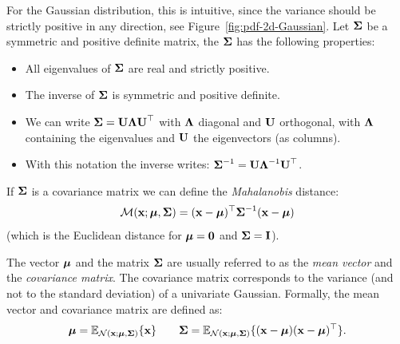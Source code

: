 
For the Gaussian distribution, this is intuitive, since the variance should be strictly positive in any direction, see Figure~\ref{fig:pdf-2d-Gaussian}. Let $\boldsymbol{\mathbf{\Sigma}}$ be a symmetric and positive definite matrix, the $\boldsymbol{\mathbf{\Sigma}}$ has the following properties:
\begin{itemize}
    \item All eigenvalues of $\boldsymbol{\mathbf{\Sigma}}$ are real and  strictly positive.
    \item The inverse of $\boldsymbol{\mathbf{\Sigma}}$ is symmetric and positive definite.
    \item We can write $\boldsymbol{\mathbf{\Sigma}}=\boldsymbol{\mathbf{U}}\boldsymbol{\mathbf{\Lambda}}\boldsymbol{\mathbf{U}}^\top$ with $\boldsymbol{\mathbf{\Lambda}}$ diagonal and $\boldsymbol{\mathbf{U}}$ orthogonal, with $\boldsymbol{\mathbf{\Lambda}}$ containing the eigenvalues and $\boldsymbol{\mathbf{U}}$ the eigenvectors (as columns).
    \item With this notation the inverse writes: $\boldsymbol{\mathbf{\Sigma}}^{-1} = \boldsymbol{\mathbf{U}}\boldsymbol{\mathbf{\Lambda}}^{-1}\boldsymbol{\mathbf{U}}^\top$.
\end{itemize}


If $\boldsymbol{\mathbf{\Sigma}}$ is a covariance matrix we can define the \textit{Mahalanobis} distance:
\begin{equation}
\mathcal{M}(\boldsymbol{\mathbf{x}};\boldsymbol{\mathbf{\mu}},\boldsymbol{\mathbf{\Sigma}}) = (\boldsymbol{\mathbf{x}}-\boldsymbol{\mathbf{\mu}})^\top\boldsymbol{\mathbf{\Sigma}}^{-1}(\boldsymbol{\mathbf{x}}-\boldsymbol{\mathbf{\mu}})
\end{equation}
(which is the Euclidean distance for $\boldsymbol{\mathbf{\mu}}=\boldsymbol{\mathbf{0}}$ and $\boldsymbol{\mathbf{\Sigma}}=\boldsymbol{\mathbf{I}}$).\\


The vector $\boldsymbol{\mathbf{\mu}}$ and the matrix $\boldsymbol{\mathbf{\Sigma}}$ are usually referred to as the \textit{mean vector} and the \textit{covariance matrix}. The covariance matrix corresponds to the variance (and not to the standard deviation) of a univariate Gaussian. Formally, the mean vector and covariance matrix are defined as:
\begin{equation}
 \boldsymbol{\mathbf{\mu}} = \mathbb{E}_{\mathcal{N}(\boldsymbol{\mathbf{x}};\boldsymbol{\mathbf{\mu}},\boldsymbol{\mathbf{\Sigma}})}\{\mathbf{x}\} \qquad \boldsymbol{\mathbf{\Sigma}} = \mathbb{E}_{\mathcal{N}(\boldsymbol{\mathbf{x}};\boldsymbol{\mathbf{\mu}},\boldsymbol{\mathbf{\Sigma}})}\{(\mathbf{x}-\boldsymbol{\mathbf{\mu}})(\mathbf{x}-\boldsymbol{\mathbf{\mu}})^\top\}.
\end{equation}



